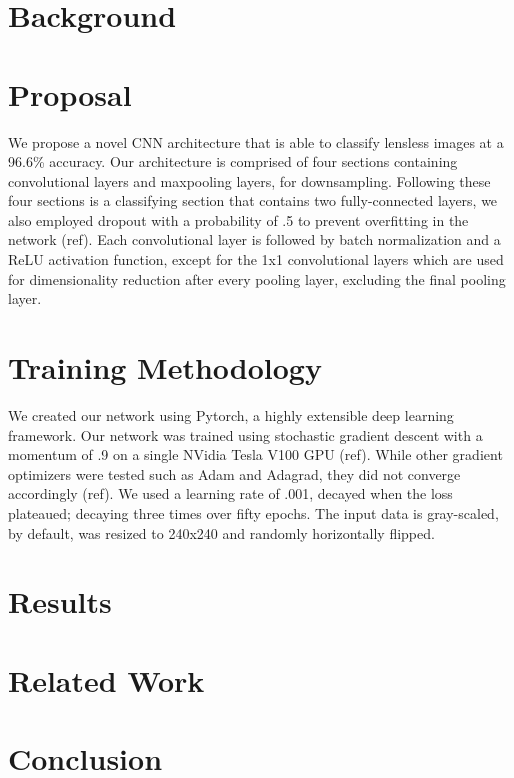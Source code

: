 \documentclass[11pt,conference]{ieeeconf}
\begin{document}
\section{Background}

\section{Proposal}
We propose a novel CNN architecture that is able to classify lensless images at a 96.6\% accuracy. Our architecture is comprised of four sections containing convolutional layers and maxpooling layers, for downsampling. Following these four sections is a classifying section that contains two fully-connected layers, we also employed dropout with a probability of .5 to prevent overfitting in the network (ref). Each convolutional layer is followed by batch normalization and a ReLU activation function, except for the 1x1 convolutional layers which are used for dimensionality reduction after every pooling layer, excluding the final pooling layer.

\section{Training Methodology}
We created our network using Pytorch, a highly extensible deep learning framework. Our network was trained using stochastic gradient descent with a momentum of .9 on a single NVidia Tesla V100 GPU (ref). While other gradient optimizers were tested such as Adam and Adagrad, they did not converge accordingly (ref). We used a learning rate of .001, decayed when the loss plateaued; decaying three times over fifty epochs. The input data is gray-scaled, by default, was resized to 240x240 and randomly horizontally flipped.

\section{Results}

\section{Related Work}

\section{Conclusion}


\end{document}
